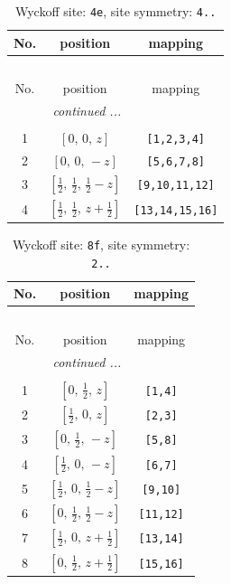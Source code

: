 \documentclass[fleqn,8pt]{jsarticle}
\begin{document}
\renewcommand{\arraystretch}{1.2}
\begin{longtable}{ccc}
\caption{Wyckoff site: {\tt 4e}, site symmetry: {\tt 4..}}
 \\
 \hline \hline
No. & position & mapping \\ \hline \endfirsthead

\multicolumn{2}{l}{\tablename\ \thetable{}} \\
 \hline \hline
No. & position & mapping \\ \hline \endhead

 \hline \hline
\multicolumn{2}{r}{\footnotesize\it continued ...} \\ \endfoot

 \hline \hline
\multicolumn{2}{r}{} \\ \endlastfoot

1 & $\left[ 0,\, 0,\, z \right]$ & {\tt [1,2,3,4]} \\ \hline
2 & $\left[ 0,\, 0,\, - z \right]$ & {\tt [5,6,7,8]} \\ \hline
3 & $\left[ \frac{1}{2},\, \frac{1}{2},\, \frac{1}{2} - z \right]$ & {\tt [9,10,11,12]} \\ \hline
4 & $\left[ \frac{1}{2},\, \frac{1}{2},\, z + \frac{1}{2} \right]$ & {\tt [13,14,15,16]} \\
\end{longtable}
\renewcommand{\arraystretch}{1.2}
\begin{longtable}{ccc}
\caption{Wyckoff site: {\tt 8f}, site symmetry: {\tt 2..}}
 \\
 \hline \hline
No. & position & mapping \\ \hline \endfirsthead

\multicolumn{2}{l}{\tablename\ \thetable{}} \\
 \hline \hline
No. & position & mapping \\ \hline \endhead

 \hline \hline
\multicolumn{2}{r}{\footnotesize\it continued ...} \\ \endfoot

 \hline \hline
\multicolumn{2}{r}{} \\ \endlastfoot

1 & $\left[ 0,\, \frac{1}{2},\, z \right]$ & {\tt [1,4]} \\ \hline
2 & $\left[ \frac{1}{2},\, 0,\, z \right]$ & {\tt [2,3]} \\ \hline
3 & $\left[ 0,\, \frac{1}{2},\, - z \right]$ & {\tt [5,8]} \\ \hline
4 & $\left[ \frac{1}{2},\, 0,\, - z \right]$ & {\tt [6,7]} \\ \hline
5 & $\left[ \frac{1}{2},\, 0,\, \frac{1}{2} - z \right]$ & {\tt [9,10]} \\ \hline
6 & $\left[ 0,\, \frac{1}{2},\, \frac{1}{2} - z \right]$ & {\tt [11,12]} \\ \hline
7 & $\left[ \frac{1}{2},\, 0,\, z + \frac{1}{2} \right]$ & {\tt [13,14]} \\ \hline
8 & $\left[ 0,\, \frac{1}{2},\, z + \frac{1}{2} \right]$ & {\tt [15,16]} \\
\end{longtable}
\end{document}
